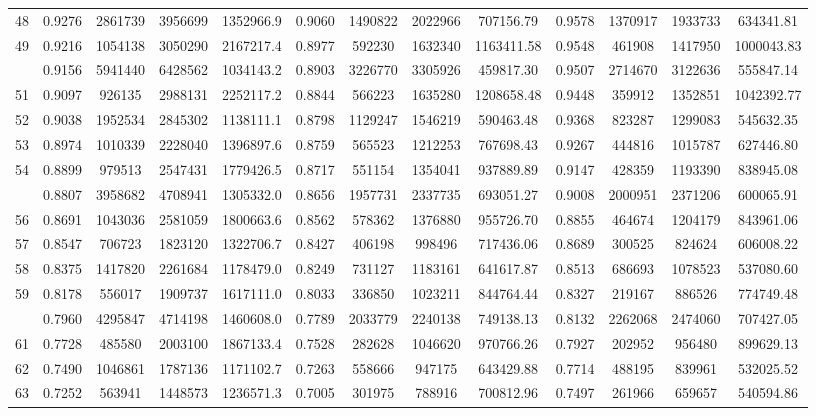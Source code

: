 \documentclass[
  12pt,
]{article}
\begin{document}
\begin{longtable}[t]{lcccccccccccc}
48 & 0.9276 & 2861739 & 3956699 & 1352966.9 & 0.9060 & 1490822 & 2022966 & 707156.79 & 0.9578 & 1370917 & 1933733 & 634341.81\\
49 & 0.9216 & 1054138 & 3050290 & 2167217.4 & 0.8977 & 592230 & 1632340 & 1163411.58 & 0.9548 & 461908 & 1417950 & 1000043.83\\
\addlinespace
50 & 0.9156 & 5941440 & 6428562 & 1034143.2 & 0.8903 & 3226770 & 3305926 & 459817.30 & 0.9507 & 2714670 & 3122636 & 555847.14\\
51 & 0.9097 & 926135 & 2988131 & 2252117.2 & 0.8844 & 566223 & 1635280 & 1208658.48 & 0.9448 & 359912 & 1352851 & 1042392.77\\
52 & 0.9038 & 1952534 & 2845302 & 1138111.1 & 0.8798 & 1129247 & 1546219 & 590463.48 & 0.9368 & 823287 & 1299083 & 545632.35\\
53 & 0.8974 & 1010339 & 2228040 & 1396897.6 & 0.8759 & 565523 & 1212253 & 767698.43 & 0.9267 & 444816 & 1015787 & 627446.80\\
54 & 0.8899 & 979513 & 2547431 & 1779426.5 & 0.8717 & 551154 & 1354041 & 937889.89 & 0.9147 & 428359 & 1193390 & 838945.08\\
\addlinespace
55 & 0.8807 & 3958682 & 4708941 & 1305332.0 & 0.8656 & 1957731 & 2337735 & 693051.27 & 0.9008 & 2000951 & 2371206 & 600065.91\\
56 & 0.8691 & 1043036 & 2581059 & 1800663.6 & 0.8562 & 578362 & 1376880 & 955726.70 & 0.8855 & 464674 & 1204179 & 843961.06\\
57 & 0.8547 & 706723 & 1823120 & 1322706.7 & 0.8427 & 406198 & 998496 & 717436.06 & 0.8689 & 300525 & 824624 & 606008.22\\
58 & 0.8375 & 1417820 & 2261684 & 1178479.0 & 0.8249 & 731127 & 1183161 & 641617.87 & 0.8513 & 686693 & 1078523 & 537080.60\\
59 & 0.8178 & 556017 & 1909737 & 1617111.0 & 0.8033 & 336850 & 1023211 & 844764.44 & 0.8327 & 219167 & 886526 & 774749.48\\
\addlinespace
60 & 0.7960 & 4295847 & 4714198 & 1460608.0 & 0.7789 & 2033779 & 2240138 & 749138.13 & 0.8132 & 2262068 & 2474060 & 707427.05\\
61 & 0.7728 & 485580 & 2003100 & 1867133.4 & 0.7528 & 282628 & 1046620 & 970766.26 & 0.7927 & 202952 & 956480 & 899629.13\\
62 & 0.7490 & 1046861 & 1787136 & 1171102.7 & 0.7263 & 558666 & 947175 & 643429.88 & 0.7714 & 488195 & 839961 & 532025.52\\
63 & 0.7252 & 563941 & 1448573 & 1236571.3 & 0.7005 & 301975 & 788916 & 700812.96 & 0.7497 & 261966 & 659657 & 540594.86\\

\end{longtable}
\end{document}
